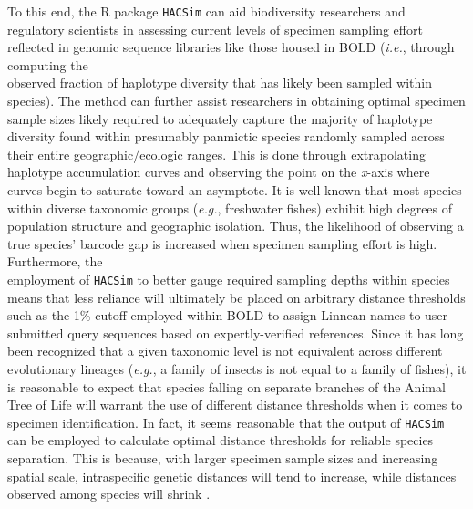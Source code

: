 To this end, the R package {\tt HACSim} \cite{phillips2020hacsim} can aid biodiversity researchers and \\ regulatory scientists in assessing current levels of specimen sampling effort reflected in genomic sequence libraries like those housed in BOLD (\textit{i.e.}, through computing the \\ observed fraction of haplotype diversity that has likely been sampled within species). The method can further assist researchers in obtaining optimal specimen sample sizes likely required to adequately capture the majority of haplotype diversity found within presumably panmictic species randomly sampled across their entire geographic/ecologic ranges. This is done through extrapolating haplotype accumulation curves and observing the point on the \textit{x}-axis where curves begin to saturate toward an asymptote. It is well known that most species within diverse taxonomic groups (\textit{e.g.}, freshwater fishes) exhibit high degrees of population structure and geographic isolation. Thus, the likelihood of observing a true species' barcode gap is increased when specimen sampling effort is high. Furthermore, the \\ employment of {\tt HACSim} to better gauge required sampling depths within species means that less reliance will ultimately be placed on arbitrary distance thresholds such as the 1\% cutoff employed within BOLD \cite{ratnasingham2007bold, ratnasingham2013dna} to assign Linnean names to user-submitted query sequences based on expertly-verified references. Since it has long been recognized that a given taxonomic level is not equivalent across different evolutionary lineages (\textit{e.g.}, a family of insects is not equal to a family of fishes), it is reasonable to expect that species falling on separate branches of the Animal Tree of Life will warrant the use of different distance thresholds when it comes to specimen identification. In fact, it seems reasonable that the output of {\tt HACSim} can be employed to calculate optimal distance thresholds for reliable species separation. This is because, with larger specimen sample sizes and increasing spatial scale, intraspecific genetic distances will tend to increase, while distances observed among species will shrink \cite{bergsten2012effect, meyer2005dna}.



